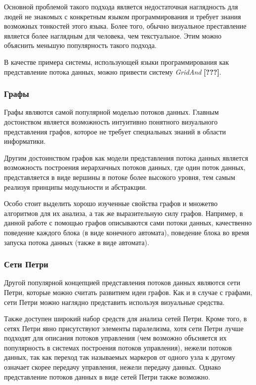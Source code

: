 \documentclass[10pt,a4paper]{article}
\begin{document}
Основной проблемой такого подхода является недостаточная наглядность для людей не знакомых с конкретным языком программирования и требует знания возможных тонкостей этого языка.
Более того, обычно визуальное преставление является более наглядным для человека, чем текстуальное. Этим можно объяснить меньшую популярность такого подхода.

В качестве примера системы, использующей языки программирования как представление потока данных, можно привести систему \textit{GridAnd} \textbf{[???]}.

\subsubsection{Графы}
Графы являются самой популярной моделью потоков данных.
Главным достоиством является возможность интуитивно понятного визуального представления графов, которое не требует специальных знаний в области информатики.

Другим достоинством графов как модели представления потока данных является возможность построения иерархичных потоков данных, где один поток данных,
представляется в виде вершины в потоке более высокого уровня, тем самым реализуя принципы модульности и абстракции.

Особо стоит выделить хорошо изученные свойства графов и множетво алгоритмов для их анализа, а так же выразительную силу графов.
Например, в данной работе с помощью графов описываются сами потоки данных, качественно поведение каждого блока (в виде конечного автомата),
поведение блока во время запуска потока данных (также в виде автомата).

\subsubsection{Сети Петри}
Другой популярной концепцией представления потоков данных являются сети Петри, которые можно считать развитием идеи графов.
Как и в случае с графами, сети Петри можно наглядно представить используя визуальные средства.

Также доступен широкий набор средств для анализа сетей Петри. Кроме того, в сетях Петри явно присутствуют элементы паралелизма,
хотя сети Петри лучше подходят для описания потоков управления (чем возможно объсняется их популярность в системах построения потоков управления),
нежели потоков данных, так как переход так называемых маркеров от одного узла к другому означает
скорее передачу управления, нежели передачу данных. Однако представление потоков данных в виде сетей Петри также возможно.
\end{document}
